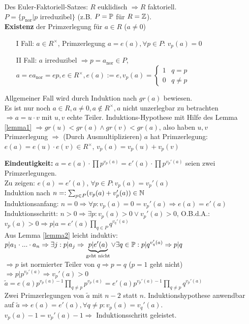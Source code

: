 \documentclass[a4paper,twoside,DIV15,BCOR12mm]{scrbook}
\begin{document}
\begin{beweis}
Des Euler-Faktoriell-Satzes: $R$ euklidisch $\Rightarrow R$ faktoriell.\\
$P = \{p_{\text{nor}} | p \text{ irreduzibel}\}$ (z.B. $P = \mathbb{P}$ für $R = \mathbb{Z}$).\\
\textbf{Existenz} der Primzerlegung für $a\in R$ ($a \ne 0$)
\begin{itemize}
\item[I] Fall: $a \in R^\times$, Primzerlegung $a = e(a), \forall p \in P$: $v_p(a) = 0$
\item[II] Fall: $a$ irreduzibel $\Rightarrow p = a_{\text{nor}} \in P$, $a = ea_{\text{nor}} = ep, e \in R^\times, e(a) := e, v_p(a) = \begin{cases}1 & q = p\\0 & q \not= p\end{cases}$
\end{itemize}
Allgemeiner Fall wird durch Induktion nach $gr(a)$ bewiesen.\\
Es ist nur noch $a \in R, a \not= 0, a \not\in R^\times, a$ nicht
unzerlegbar zu betrachten $\Rightarrow a = u \cdot v$ mit $u,v$
echte Teiler. Induktions-Hypothese mit Hilfe des Lemma \ref{lemma1}
$\Rightarrow gr(u) < gr(a) \wedge gr(v) < gr(a)$, also haben $u,v$
Primzerlegung $\Rightarrow$ (Durch Ausmultiplizieren) $a$ hat
Primzerlegung: $e(a) = e(u) \cdot e(v) \in R^\times$, $v_p(a) =
v_p(u) + v_p(v)$

\textbf{Eindeutigkeit:}
$a = e(a) \cdot \prod p^{v_p(a)} = e'(a) \cdot \prod p^{v_p'(a)}$ seien zwei Primzerlegungen.\\
Zu zeigen: $e(a) = e'(a)$, $\forall p \in P: v_p(a) = v_p'(a)$\\
Induktion nach $n =: \sum_{p \in P}(v_p(a) + v_p'(a)) \in \mathbb{N}$\\
Induktionsanfang: $n=0 \Rightarrow \forall p: v_p(a) = 0 = v_p'(a) \Rightarrow e(a) = e'(a)$\\
Induktionsschritt: $n > 0 \Rightarrow \exists p: v_p(a) > 0 \vee v_p'(a) > 0$, O.B.d.A.: $v_p(a) > 0 \Rightarrow p|a = e'(a) \prod_{q\in P}q^{v_q'(a)}$\\
Aus Lemma \ref{lemma2} leicht induktiv: $p|a_1 \cdot ... \cdot a_n \Rightarrow \exists j: p | a_j \Rightarrow \underbrace{p|e'(a)}_{\text{geht nicht}} \vee \exists q\in\mathbb{P}: p|q^{v_q'(a)} \Rightarrow p|q$\\
$\Rightarrow p$ ist normierter Teiler von $q \Rightarrow p = q$ ($p = 1$ geht nicht) $\Rightarrow p | p^{v_p'(a)} \Rightarrow v_p'(a) > 0$\\
$\tilde{a} = e(a) p^{v_p(a)-1} \prod_{q \not= p}p^{v_p(a)} = e'(a)p^{v_p'(a)-1} \prod_{q \not= p}q^{v_p'(a)}$\\
Zwei Primzerlegungen von $\tilde{a}$ mit $n-2$ statt $n$.
Induktionshypothese anwendbar auf $\tilde{a} \Rightarrow e(a) =
e'(a), \forall q\not= p: v_p(a) = v_q'(a)$. $v_p(a) -1 = v_p'(a) -1
\Rightarrow$ Induktionsschritt geleistet.
\end{beweis}
\end{document}
